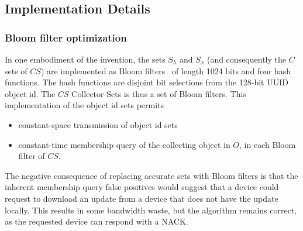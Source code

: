 \subsection*{Implementation Details}

\subsubsection*{Bloom filter optimization}
In one embodiment of the invention, the sets $S_h$ and $S_x$ (and consequently
the $C$ sets of $CS$) are implemented as Bloom filters~\cite{bloom:cacm70} of
length 1024 bits and four hash functions. The hash functions are disjoint bit
selections from the 128-bit UUID object id. The $CS$ Collector Sets is thus a
set of Bloom filters. This implementation of the object id sets permits
\begin{itemize}
 \item constant-space transmission of object id sets
 \item constant-time membership query of the collecting object in $O$, in each
Bloom filter of $CS$.
\end{itemize}

The negative consequence of replacing accurate sets with Bloom filters is that
the inherent membership query false positives would suggest that a device could
request to download an update from a device that does not have the update
locally. This results in some bandwidth waste, but the algorithm remains
correct, as the requested device can respond with a NACK.

